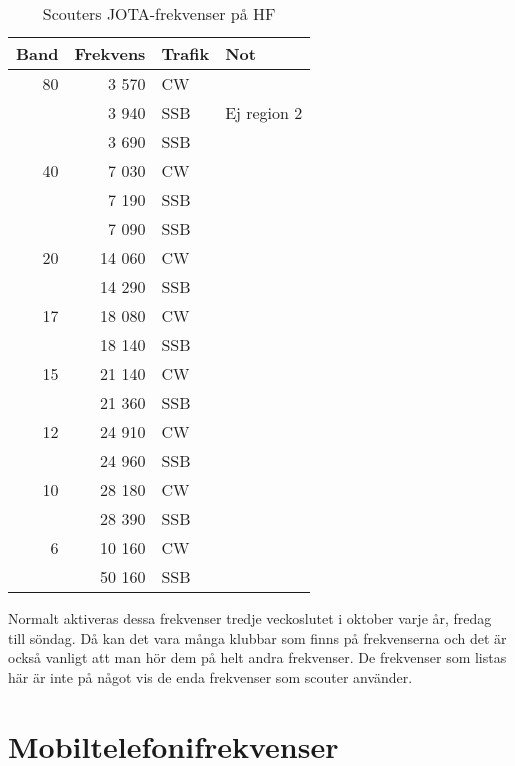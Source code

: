 {\begin{table}[H]
\centering
\begin{tabular}{rrll}
	\textbf{Band} & \textbf{Frekvens} & \textbf{Trafik} & \textbf{Not} \\ \hline
               80 & 3 570  & CW  &             \\
	              & 3 940  & SSB & Ej region 2 \\
	              & 3 690  & SSB &             \\ \hline
	           40 & 7 030  & CW  &             \\
	              & 7 190  & SSB &             \\
	              & 7 090  & SSB &             \\ \hline
	           20 & 14 060 & CW  &             \\
	              & 14 290 & SSB &             \\ \hline
	           17 & 18 080 & CW  &             \\
	              & 18 140 & SSB &             \\ \hline
	           15 & 21 140 & CW  &             \\
	              & 21 360 & SSB &             \\ \hline
	           12 & 24 910 & CW  &             \\
	              & 24 960 & SSB &             \\ \hline
	           10 & 28 180 & CW  &             \\
	              & 28 390 & SSB &             \\ \hline
	            6 & 10 160 & CW  &             \\
	              & 50 160 & SSB &             \\ \hline
\end{tabular}
\caption{Scouters JOTA-frekvenser på HF}
\end{table}

Normalt aktiveras dessa frekvenser tredje veckoslutet i oktober varje år,
fredag till söndag. Då kan det vara många klubbar som finns på frekvenserna
och det är också vanligt att man hör dem på helt andra frekvenser. De
frekvenser som listas här är inte på något vis de enda frekvenser som scouter
använder.

\clearpage

\section{Mobiltelefonifrekvenser}
\label{mobiltelefoni}

}
